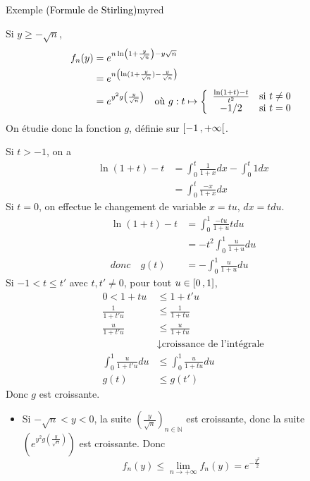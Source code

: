 \begin{omed}{Exemple \textcolor{black}{(Formule de Stirling)}}{myred}
\begin{itemize}
            Si $y \geq -\sqrt{n}$,
            \begin{align*}
                f_n(y)
                &= e^{n \ln\left( 1 + \frac{y}{\sqrt{n}}\right) - y \sqrt{n}} \\
                &= e^{n \left( \ln(1 + \frac{y}{\sqrt{n}}) - \frac{y}{\sqrt{n}} \right)} \\
                &= e^{y^2 g\left( \frac{y}{\sqrt{n}} \right)} \quad \text{où } g : t \mapsto \sisi{\frac{\ln(1 + t) -t}{t^2}}{t \neq 0}{-1/2}{t=0}
             \end{align*}
            On étudie donc la fonction $g$, définie sur $\left[ -1 \, , +\infty \right[$.
            
            Si $t > -1$, on a 
            \begin{align*}
                \ln(1+t) - t 
                &= \int_{0}^{t} \frac{1}{1+x} dx - \int_{0}^{t} 1 dx \\
                &= \int_{0}^{t} \frac{-x}{1+x}dx 
            \end{align*}
            Si $t=0$, on effectue le changement de variable $x = tu$, $dx = tdu$.
            \begin{align*}
                \ln(1+t)-t 
                &= \int_{0}^{1} \frac{-tu}{1+u} t du \\
                &= -t^2 \int_{0}^{1} \frac{u}{1+u}du \\
                \textit{donc} \quad g(t) 
                &= - \int_{0}^{1} \frac{u}{1+u} du 
            \end{align*}
            Si $-1 < t \leq t'$ avec $t, t' \neq 0$, pour tout $u \in \left[ 0 \, , 1 \right]$, 
            \begin{align*}
                0 < 1 + tu &\leq 1 + t' u \\
                \frac{1}{1 + t'u} &\leq \frac{1}{1 + t u} \\
                \frac{u}{1 + t'u} &\leq \frac{u}{1 + t u} \\
                & \downarrow \text{croissance de l’intégrale}\\
                \int_{0}^{1} \frac{u}{1 + t' u} du &\leq \int_{0}^{1} \frac{u}{1 + tu} du \\
                g(t) &\leq g(t')
            \end{align*}
            Donc $g$ est croissante.
            \begin{itemize}
                \item Si $-\sqrt{n} < y < 0$, la suite $\left( \frac{y}{\sqrt{n}} \right)_{n \in \mathbb{N}}$ est croissante, donc la suite $\left(  e^{y^2 g\left(\frac{y}{\sqrt{n}}\right)} \right)$ est croissante. Donc \[ f_n(y) \leq \lim_{n \rightarrow +\infty} f_n(y) = e^{-\frac{y^2}{2}}\] 

\end{itemize}
\end{itemize}
\end{omed}
